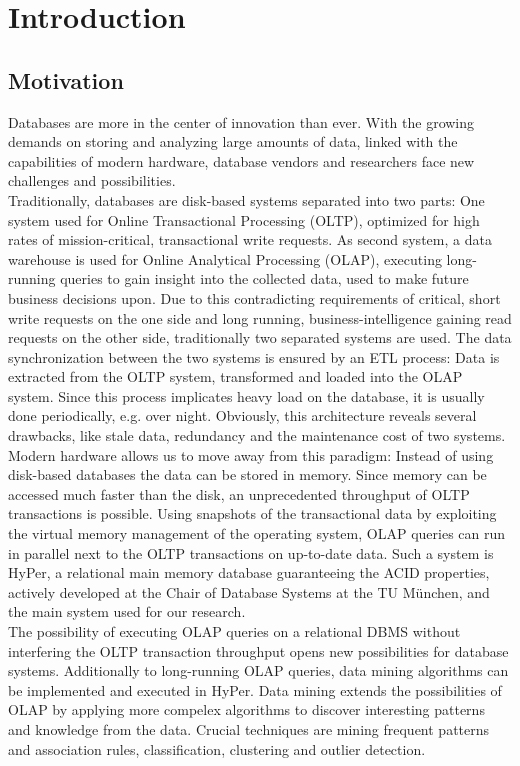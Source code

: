 \chapter{Introduction}\label{chapter:introduction}

\section{Motivation}


Databases are more in the center of innovation than ever. With the growing demands on storing and analyzing large amounts of data, linked with the capabilities of modern hardware, database vendors and researchers face new challenges and possibilities. 
\\
Traditionally, databases are disk-based systems separated into two parts: One system used for Online Transactional Processing (OLTP), optimized for high rates of mission-critical, transactional write requests. As second system, a data warehouse is used for Online Analytical Processing (OLAP), executing long-running queries to gain insight into the  collected data, used to make future business decisions upon. Due to this contradicting requirements of critical, short write requests on the one side and long running, business-intelligence gaining read requests on the other side, traditionally two separated systems are used. The data synchronization between the two systems is ensured by an ETL process: Data is extracted from the OLTP system, transformed and loaded into the OLAP system. Since this process implicates heavy load on the database, it is usually done periodically, e.g. over night. Obviously, this architecture reveals several drawbacks, like stale data, redundancy and the maintenance cost of two systems.
\\
Modern hardware allows us to move away from this paradigm: Instead of using disk-based databases the data can be stored in memory. Since memory can be accessed much faster than the disk, an unprecedented throughput of OLTP transactions is possible. Using snapshots of the transactional data by exploiting the virtual memory management of the operating system, OLAP queries can run in parallel next to the OLTP transactions on up-to-date data. Such a system is HyPer, a relational main memory database guaranteeing the ACID properties, actively developed at the Chair of Database Systems at the TU München, and the main system used for our research. 
\\
The possibility of executing OLAP queries on a relational DBMS without interfering the OLTP transaction throughput opens new possibilities for database systems. Additionally to long-running OLAP queries, data mining algorithms can be implemented and executed in HyPer. Data mining extends the possibilities of OLAP by applying more compelex algorithms to discover interesting patterns and knowledge from the data. Crucial techniques are mining frequent patterns and association rules, classification, clustering and outlier detection.
